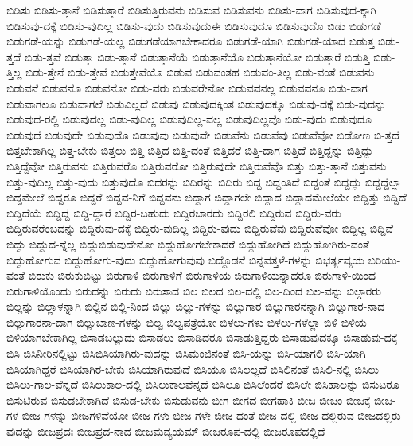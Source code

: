 {ಬಿಡಿಸು
ಬಿಡಿಸು-ತ್ತಾನೆ
ಬಿಡಿಸುತ್ತಾರೆ
ಬಿಡಿಸುತ್ತಿರುವನು
ಬಿಡಿಸುವ
ಬಿಡಿಸುವನು
ಬಿಡಿಸು-ವಾಗ
ಬಿಡಿಸುವುದ-ಕ್ಕಾಗಿ
ಬಿಡಿಸುವು-ದಕ್ಕೆ
ಬಿಡಿಸು-ವುದಿಲ್ಲ
ಬಿಡಿಸು-ವುದು
ಬಿಡಿಸುವುದುಈ
ಬಿಡಿಸುವುದೂ
ಬಿಡಿಸುವುದೊ
ಬಿಡು
ಬಿಡುಗಡೆ
ಬಿಡುಗಡೆ-ಯನ್ನು
ಬಿಡುಗಡೆ-ಯಲ್ಲ
ಬಿಡುಗಡೆಯಾಗಬೇಕಾದರೂ
ಬಿಡುಗಡೆ-ಯಾಗಿ
ಬಿಡುಗಡೆ-ಯಾದ
ಬಿಡುತ್ತ
ಬಿಡು-ತ್ತದೆ
ಬಿಡು-ತ್ತವೆ
ಬಿಡುತ್ತಾ
ಬಿಡು-ತ್ತಾನೆ
ಬಿಡುತ್ತಾನೆಯೆ
ಬಿಡುತ್ತಾನೆಯೊ
ಬಿಡುತ್ತಾನೆಯೋ
ಬಿಡುತ್ತಾರೆ
ಬಿಡುತ್ತಿ
ಬಿಡು-ತ್ತಿಲ್ಲ
ಬಿಡು-ತ್ತೇನೆ
ಬಿಡು-ತ್ತೇವೆ
ಬಿಡುತ್ತೇವೆಯೊ
ಬಿಡುವ
ಬಿಡುವಂತಹ
ಬಿಡುವಂ-ತಿಲ್ಲ
ಬಿಡು-ವಂತೆ
ಬಿಡುವನು
ಬಿಡುವನೆ
ಬಿಡುವನೊ
ಬಿಡುವನೋ
ಬಿಡು-ವರು
ಬಿಡುವರೇನೋ
ಬಿಡುವವನಲ್ಲ
ಬಿಡುವವನೂ
ಬಿಡು-ವಾಗ
ಬಿಡುವಾಗಲೂ
ಬಿಡುವಾಗಲೆ
ಬಿಡುವಿಲ್ಲದೆ
ಬಿಡುವು
ಬಿಡುವುದಕ್ಕಿಂತ
ಬಿಡುವುದಕ್ಕೂ
ಬಿಡುವು-ದಕ್ಕೆ
ಬಿಡು-ವುದನ್ನು
ಬಿಡುವುದ-ರಲ್ಲಿ
ಬಿಡುವುದಲ್ಲ
ಬಿಡು-ವುದಿಲ್ಲ
ಬಿಡುವುದಿಲ್ಲ-ವಲ್ಲ
ಬಿಡುವುದಿಲ್ಲವೊ
ಬಿಡು-ವುದು
ಬಿಡುವುದೂ
ಬಿಡುವುದೆ
ಬಿಡುವುದೇ
ಬಿಡುವುದೊ
ಬಿಡುವುವು
ಬಿಡುವುವೇ
ಬಿಡುವೆನು
ಬಿಡುವೆವು
ಬಿಡುವೆವೋ
ಬಿಡೋಣ
ಬಿ-ತ್ತದೆ
ಬಿತ್ತಬೇಕಾಗಿಲ್ಲ
ಬಿತ್ತ-ಬೇಕು
ಬಿತ್ತಲು
ಬಿತ್ತಿ
ಬಿತ್ತಿದ
ಬಿತ್ತಿ-ದಂತೆ
ಬಿತ್ತಿದರೆ
ಬಿತ್ತಿ-ದಾಗ
ಬಿತ್ತಿದೆ
ಬಿತ್ತಿದ್ದನ್ನು
ಬಿತ್ತಿದ್ದು
ಬಿತ್ತಿದ್ದೆವೋ
ಬಿತ್ತಿರುವನು
ಬಿತ್ತಿರುವರೊ
ಬಿತ್ತಿರುವರೋ
ಬಿತ್ತಿರುವುದೇ
ಬಿತ್ತಿರುವೆವೊ
ಬಿತ್ತು
ಬಿತ್ತು-ತ್ತಾನೆ
ಬಿತ್ತುವನು
ಬಿತ್ತು-ವುದಿಲ್ಲ
ಬಿತ್ತು-ವುದು
ಬಿತ್ತುವುದೊ
ಬಿದರನ್ನು
ಬಿದಿರನ್ನು
ಬಿದಿರು
ಬಿದ್ದ
ಬಿದ್ದಂತಿದೆ
ಬಿದ್ದಂತೆ
ಬಿದ್ದದ್ದು
ಬಿದ್ದದ್ದೆಲ್ಲಾ
ಬಿದ್ದಮೇಲೆ
ಬಿದ್ದರೂ
ಬಿದ್ದರೆ
ಬಿದ್ದವ-ನಿಗೆ
ಬಿದ್ದವನು
ಬಿದ್ದಾಗ
ಬಿದ್ದಾಗಲೇ
ಬಿದ್ದಾದ
ಬಿದ್ದಾದಮೇಲೆಯೇ
ಬಿದ್ದಿತ್ತು
ಬಿದ್ದಿದೆ
ಬಿದ್ದಿದೆಯೆ
ಬಿದ್ದಿದ್ದ
ಬಿದ್ದಿ-ದ್ದಾರೆ
ಬಿದ್ದಿರ-ಬಹುದು
ಬಿದ್ದಿರಬಾರದು
ಬಿದ್ದಿರಲಿ
ಬಿದ್ದಿರುವ
ಬಿದ್ದಿರು-ವರು
ಬಿದ್ದಿರುವರೆಂಬದನ್ನು
ಬಿದ್ದಿರುವು-ದಕ್ಕೆ
ಬಿದ್ದಿರು-ವುದಿಲ್ಲ
ಬಿದ್ದಿರು-ವುದು
ಬಿದ್ದಿರುವೆವು
ಬಿದ್ದಿರುವೆವೋ
ಬಿದ್ದಿಲ್ಲ
ಬಿದ್ದಿವೆ
ಬಿದ್ದು
ಬಿದ್ದುದ-ನ್ನೆಲ್ಲ
ಬಿದ್ದುಬಿಡುವುದೇನೋ
ಬಿದ್ದುಹೋಗಬೇಕಾದರೆ
ಬಿದ್ದುಹೋಗಿದೆ
ಬಿದ್ದುಹೋಗಿರು-ವಂತೆ
ಬಿದ್ದುಹೋಗುವ
ಬಿದ್ದುಹೋಗು-ವುದು
ಬಿದ್ದುಹೋಗುವುವು
ಬಿದ್ದೊಡನೆ
ಬಿನ್ನವತ್ತಳೆ-ಗಳನ್ನು
ಬಿಭರ್ತ್ಯವ್ಯಯ
ಬಿರಿಯು-ವಂತೆ
ಬಿರುಕು
ಬಿರುಕುಬಿಟ್ಟು
ಬಿರುಗಾಳಿ
ಬಿರುಗಾಳಿಗೆ
ಬಿರುಗಾಳಿಯ
ಬಿರುಗಾಳಿಯನ್ನಾದರೂ
ಬಿರುಗಾಳಿ-ಯಿಂದ
ಬಿರುಗಾಳಿಯೊಂದು
ಬಿರುದನ್ನು
ಬಿರುದು
ಬಿರುಸಾದ
ಬಿಲ
ಬಿಲದ
ಬಿಲ-ದಲ್ಲಿ
ಬಿಲ-ದಿಂದ
ಬಿಲ-ವನ್ನು
ಬಿಲ್ಗಾರರು
ಬಿಲ್ಲನ್ನು
ಬಿಲ್ಲಾಳನ್ನಾಗಿ
ಬಿಲ್ಲಿನ
ಬಿಲ್ಲಿ-ನಿಂದ
ಬಿಲ್ಲು
ಬಿಲ್ಲು-ಗಳನ್ನು
ಬಿಲ್ಲುಗಾರ
ಬಿಲ್ಲುಗಾರನನ್ನಾಗಿ
ಬಿಲ್ಲುಗಾರ-ನಾದ
ಬಿಲ್ಲುಗಾರನಾ-ದಾಗ
ಬಿಲ್ಲುಬಾಣ-ಗಳನ್ನು
ಬಿಲ್ವ
ಬಿಲ್ವಪತ್ರೆಯೋ
ಬಿಳಲು-ಗಳು
ಬಿಳಲು-ಗಳೆಲ್ಲಾ
ಬಿಳಿ
ಬಿಳಿಯ
ಬಿಳಿಯಾಗಬೇಕಾಗಿಲ್ಲ
ಬಿಸಾಡಬಲ್ಲುದು
ಬಿಸಾಡಲು
ಬಿಸಾಡಿದರೂ
ಬಿಸಾಡುತ್ತಿದ್ದರು
ಬಿಸಾಡುವುದಕ್ಕೂ
ಬಿಸಾಡುವು-ದಕ್ಕೆ
ಬಿಸಿ
ಬಿಸಿನೀರಿನಲ್ಲಿಟ್ಟು
ಬಿಸಿಬಿಸಿಯಾಗಿರು-ವುದನ್ನು
ಬಿಸಿಮಂಜಿನಂತೆ
ಬಿಸಿ-ಯನ್ನು
ಬಿಸಿ-ಯಾಗಲಿ
ಬಿಸಿ-ಯಾಗಿ
ಬಿಸಿಯಾಗಿದ್ದರೆ
ಬಿಸಿಯಾಗಿರ-ಬೇಕು
ಬಿಸಿಯಾಗಿರುವುದೆ
ಬಿಸಿಯೂ
ಬಿಸಿಲಲ್ಲದೆ
ಬಿಸಿಲಿನಂತೆ
ಬಿಸಿಲಿ-ನಲ್ಲಿ
ಬಿಸಿಲು
ಬಿಸಿಲು-ಗಾಲ-ವೆನ್ನದೆ
ಬಿಸಿಲುಕಾಲ-ದಲ್ಲಿ
ಬಿಸಿಲುಕಾಲವೆನ್ನದೆ
ಬಿಸಿಲೂ
ಬಿಸಿಲೆಂದರೆ
ಬಿಸಿಲೇ
ಬಿಸಿಹಾಲನ್ನು
ಬಿಸುಟರೂ
ಬಿಸುಟಿರುವ
ಬಿಸುಡಬೇಕಾಗಿದೆ
ಬಿಸುಡ-ಬೇಕು
ಬಿಸುಡುವನು
ಬೀಗ
ಬೀಗದ
ಬೀಗಹಾಕಿ
ಬೀಜ
ಬೀಜಂ
ಬೀಜಕ್ಕೆ
ಬೀಜ-ಗಳ
ಬೀಜ-ಗಳನ್ನು
ಬೀಜಗಳಿವೆಯೋ
ಬೀಜ-ಗಳು
ಬೀಜ-ಗಳೇ
ಬೀಜ-ದಂತೆ
ಬೀಜ-ದಲ್ಲಿ
ಬೀಜ-ದಲ್ಲಿರುವ
ಬೀಜದಲ್ಲಿರು-ವುದನ್ನು
ಬೀಜಪ್ರದಃ
ಬೀಜಪ್ರದ-ನಾದ
ಬೀಜಮವ್ಯಯಮ್
ಬೀಜರೂಪ-ದಲ್ಲಿ
ಬೀಜರೂಪದಲ್ಲಿದೆ
}
